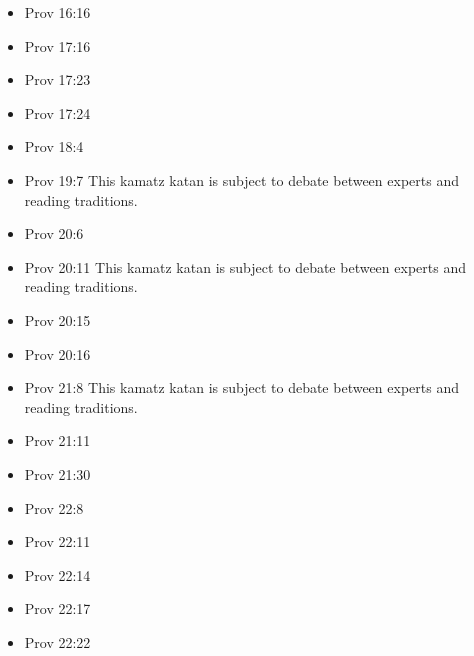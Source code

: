 \documentclass[14pt]{book}
\begin{document}
\begin{multicols}{2}
\begin{itemize}
									\item Prov 16:16
									
									\item Prov 17:16
									
									\item Prov 17:23
									
									\item Prov 17:24
									
									\item Prov 18:4
									
									\item Prov 19:7 This kamatz katan is subject to debate between experts and reading traditions.
									
									\item Prov 20:6
									
									\item Prov 20:11 This kamatz katan is subject to debate between experts and reading traditions.
									
									\item Prov 20:15
									
									\item Prov 20:16
									
									\item Prov 21:8 This kamatz katan is subject to debate between experts and reading traditions.
									
									\item Prov 21:11
									
									\item Prov 21:30
									
									\item Prov 22:8
									
									\item Prov 22:11
									
									\item Prov 22:14
									
									\item Prov 22:17
									
									\item Prov 22:22
									

\end{itemize}
\end{multicols}
\end{document}
